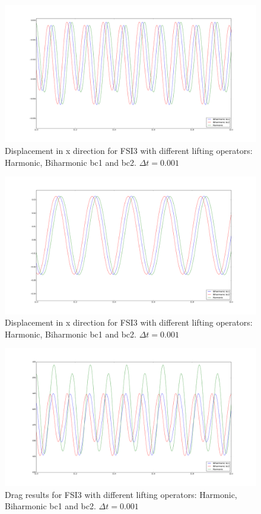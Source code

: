 \begin{figure}[] 
    \label{FSI31}
    \centering	
    \includegraphics[trim={3cm 3cm 3cm 3cm},clip,scale=0.20]{./Mesh_motion_results/FSI3_dt0001_dis_x.png} 
    \caption{Displacement in x direction for FSI3 with different lifting operators: Harmonic, Biharmonic bc1 and bc2. $\Delta t = 0.001$}
\end{figure}
\begin{figure}[]
    \label{FSI32}
    \centering
    \includegraphics[trim={3cm 3cm 3cm 3cm},scale=0.20]{./Mesh_motion_results/FSI3_dt0001_dis_y.png} 
    \caption{Displacement in x direction for FSI3 with different lifting operators: Harmonic, Biharmonic bc1 and bc2. $\Delta t = 0.001$}
\end{figure}
\begin{figure}[]
    \label{FSI33}
    \centering
    \includegraphics[trim={3cm 3cm 3cm 3cm},scale=0.20]{./Mesh_motion_results/FSI3_dt0001_Drag.png} 
    \caption{Drag results for FSI3 with different lifting operators: Harmonic, Biharmonic bc1 and bc2. $\Delta t = 0.001$}
\end{figure}
